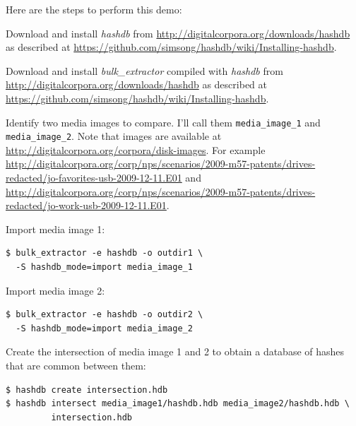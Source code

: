 \documentclass[12pt,twoside]{article}
\newcommand{\hdb}{\emph{hashdb}\xspace}
\newcommand{\bulk}{\emph{bulk\_extractor}\xspace}
\begin{document}
Here are the steps to perform this demo:
\begin{compactenum}
\item Download and install \hdb from
\url{http://digitalcorpora.org/downloads/hashdb}
as described at
\url{https://github.com/simsong/hashdb/wiki/Installing-hashdb}.
\item Download and install \bulk compiled with \hdb from
\url{http://digitalcorpora.org/downloads/hashdb}
as described at
\url{https://github.com/simsong/hashdb/wiki/Installing-hashdb}.
\item Identify two media images to compare.
I'll call them \texttt{media\_image\_1} and \texttt{media\_image\_2}.
Note that images are available at
\url{http://digitalcorpora.org/corpora/disk-images}.
For example
\url{http://digitalcorpora.org/corp/nps/scenarios/2009-m57-patents/drives-redacted/jo-favorites-usb-2009-12-11.E01}
and
\url{http://digitalcorpora.org/corp/nps/scenarios/2009-m57-patents/drives-redacted/jo-work-usb-2009-12-11.E01}.

\item Import media image 1:
\begin{verbatim}
$ bulk_extractor -e hashdb -o outdir1 \
  -S hashdb_mode=import media_image_1
\end{verbatim}

\item Import media image 2:
\begin{verbatim}
$ bulk_extractor -e hashdb -o outdir2 \
  -S hashdb_mode=import media_image_2
\end{verbatim}

\item Create the intersection of media image 1 and 2
to obtain a database of hashes that are common between them:
\begin{verbatim}
$ hashdb create intersection.hdb
$ hashdb intersect media_image1/hashdb.hdb media_image2/hashdb.hdb \
         intersection.hdb
\end{verbatim}
\end{compactenum}
\end{document}
